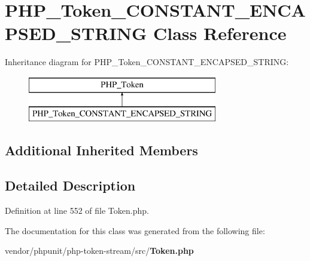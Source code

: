 \section{P\+H\+P\+\_\+\+Token\+\_\+\+C\+O\+N\+S\+T\+A\+N\+T\+\_\+\+E\+N\+C\+A\+P\+S\+E\+D\+\_\+\+S\+T\+R\+I\+N\+G Class Reference}
\label{class_p_h_p___token___c_o_n_s_t_a_n_t___e_n_c_a_p_s_e_d___s_t_r_i_n_g}
Inheritance diagram for P\+H\+P\+\_\+\+Token\+\_\+\+C\+O\+N\+S\+T\+A\+N\+T\+\_\+\+E\+N\+C\+A\+P\+S\+E\+D\+\_\+\+S\+T\+R\+I\+N\+G\+:\begin{figure}[H]
\begin{center}
\leavevmode
\includegraphics[height=2.000000cm]{class_p_h_p___token___c_o_n_s_t_a_n_t___e_n_c_a_p_s_e_d___s_t_r_i_n_g}
\end{center}
\end{figure}
\subsection*{Additional Inherited Members}


\subsection{Detailed Description}


Definition at line 552 of file Token.\+php.



The documentation for this class was generated from the following file\+:\begin{DoxyCompactItemize}
\item 
vendor/phpunit/php-\/token-\/stream/src/{\bf Token.\+php}\end{DoxyCompactItemize}
